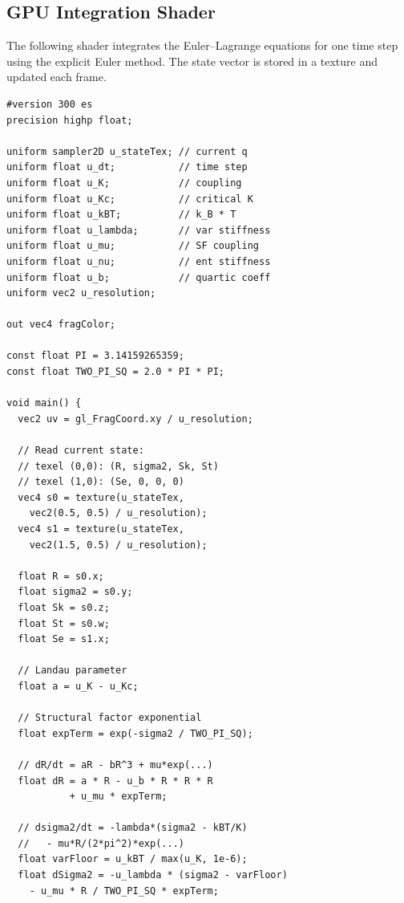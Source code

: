 \documentclass[11pt,twocolumn,a4paper]{article}
\begin{document}
\subsection{GPU Integration Shader}

The following shader integrates the Euler--Lagrange equations for one time step using the explicit Euler method.
The state vector is stored in a texture and updated each frame.

\begin{lstlisting}[style=glsl,caption={Euler--Lagrange gradient flow integration shader. Reads the current state from a texture, computes the time derivatives from the neural partition potential, and writes the updated state. One integration step per draw call.},label=lst:euler]
#version 300 es
precision highp float;

uniform sampler2D u_stateTex; // current q
uniform float u_dt;           // time step
uniform float u_K;            // coupling
uniform float u_Kc;           // critical K
uniform float u_kBT;          // k_B * T
uniform float u_lambda;       // var stiffness
uniform float u_mu;           // SF coupling
uniform float u_nu;           // ent stiffness
uniform float u_b;            // quartic coeff
uniform vec2 u_resolution;

out vec4 fragColor;

const float PI = 3.14159265359;
const float TWO_PI_SQ = 2.0 * PI * PI;

void main() {
  vec2 uv = gl_FragCoord.xy / u_resolution;

  // Read current state:
  // texel (0,0): (R, sigma2, Sk, St)
  // texel (1,0): (Se, 0, 0, 0)
  vec4 s0 = texture(u_stateTex,
    vec2(0.5, 0.5) / u_resolution);
  vec4 s1 = texture(u_stateTex,
    vec2(1.5, 0.5) / u_resolution);

  float R = s0.x;
  float sigma2 = s0.y;
  float Sk = s0.z;
  float St = s0.w;
  float Se = s1.x;

  // Landau parameter
  float a = u_K - u_Kc;

  // Structural factor exponential
  float expTerm = exp(-sigma2 / TWO_PI_SQ);

  // dR/dt = aR - bR^3 + mu*exp(...)
  float dR = a * R - u_b * R * R * R
           + u_mu * expTerm;

  // dsigma2/dt = -lambda*(sigma2 - kBT/K)
  //   - mu*R/(2*pi^2)*exp(...)
  float varFloor = u_kBT / max(u_K, 1e-6);
  float dSigma2 = -u_lambda * (sigma2 - varFloor)
    - u_mu * R / TWO_PI_SQ * expTerm;


\end{lstlisting}
\end{document}
